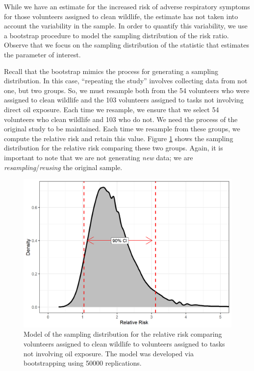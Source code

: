 \documentclass[
]{book}
\theoremstyle{plain}
\theoremstyle{mydefn}
\theoremstyle{myexmpl}
\theoremstyle{remark}
\begin{document}
While we have an estimate for the increased risk of adverse respiratory symptoms for those volunteers assigned to clean wildlife, the estimate has not taken into account the variability in the sample. In order to quantify this variability, we use a bootstrap procedure to model the sampling distribution of the risk ratio. Observe that we focus on the sampling distribution of the statistic that estimates the parameter of interest.

Recall that the bootstrap mimics the process for generating a sampling distribution. In this case, ``repeating the study'' involves collecting data from not one, but two groups. So, we must resample both from the 54 volunteers who were assigned to clean wildlife and the 103 volunteers assigned to tasks not involving direct oil exposure. Each time we resample, we ensure that we select 54 volunteers who clean wildlife and 103 who do not. We need the process of the original study to be maintained. Each time we resample from these groups, we compute the relative risk and retain this value. Figure \ref{fig:recaplanguage-sampling-distribution} shows the sampling distribution for the relative risk comparing these two groups. Again, it is important to note that we are not generating \emph{new} data; we are \emph{resampling}/\emph{reusing} the original sample.

\begin{figure}

{\centering \includegraphics[width=0.8\linewidth]{./Images/recaplanguage-sampling-distribution-1} 

}

\caption{Model of the sampling distribution for the relative risk comparing volunteers assigned to clean wildlife to volunteers assigned to tasks not involving oil exposure.  The model was developed via bootstrapping using 50000 replications.}\label{fig:recaplanguage-sampling-distribution}
\end{figure}
\end{document}
